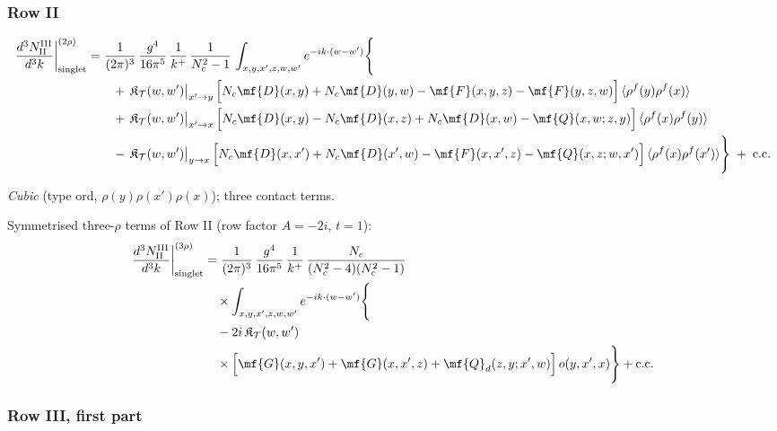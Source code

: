 {\subsubsection*{Row II}

\begin{align}
\frac{d^{3}N^{\rm III}_{\rm II}}{d^{3}k}\bigg|^{(2\rho)}_{\rm singlet}&=\frac{1}{(2\pi)^{3}}\,\frac{g^{4}}{16\pi^{5}}\,\frac{1}{k^{+}}\,\frac{1}{N_{c}^{2}-1}\,\int_{x,y,x',z,w,w'}e^{-ik\cdot(w-w')}\Bigg\{\notag\\
&\qquad +\,\mathfrak{K}_{\mathcal{T}}(w,w')\big|_{x'\to y}\,\Big[N_{c}\mf{D}(x,y)+N_{c}\mf{D}(y,w)-\mf{F}(x,y,z)-\mf{F}(y,z,w)\Big]\,\langle\rho^{f}(y)\rho^{f}(x)\rangle\notag\\
&\qquad +\,\mathfrak{K}_{\mathcal{T}}(w,w')\big|_{x'\to x}\,\Big[N_{c}\mf{D}(x,y)-N_{c}\mf{D}(x,z)+N_{c}\mf{D}(x,w)-\mf{Q}(x,w;z,y)\Big]\,\langle\rho^{f}(x)\rho^{f}(y)\rangle\notag\\
&\qquad -\,\mathfrak{K}_{\mathcal{T}}(w,w')\big|_{y\to x}\,\Big[N_{c}\mf{D}(x,x')+N_{c}\mf{D}(x',w)-\mf{F}(x,x',z)-\mf{Q}(x,z;w,x')\Big]\,\langle\rho^{f}(x)\rho^{f}(x')\rangle\Bigg\}\;+\;{\rm c.c.}\label{eq:s-III-II}
\end{align}

\emph{Cubic} (type ord, $\rho(y)\rho(x')\rho(x)$); three contact terms.

 Symmetrised three-$\rho$ terms of Row II (row factor $A=-2i$, $t=1$):
\begin{align}
\frac{d^{3}N^{\rm III}_{\rm II}}{d^{3}k}\bigg|^{(3\rho)}_{\rm singlet}&=\frac{1}{(2\pi)^{3}}\,\frac{g^{4}}{16\pi^{5}}\,\frac{1}{k^{+}}\,\frac{N_{c}}{(N_{c}^{2}-4)(N_{c}^{2}-1)}\notag\\
&\quad\times\int_{x,y,x',z,w,w'}e^{-ik\cdot(w-w')}\Bigg\{\notag\\
&\quad-2i\,\mathfrak{K}_{\mathcal{T}}(w,w')\notag\\
&\quad\times\Big[\mf{G}(x,y,x')+\mf{G}(x,x',z)+\mf{Q}_{d}(z,y;x',w)\Big]\,o(y,x',x)\Bigg\}+{\rm c.c.}\label{eq:s-o-III-II}
\end{align}
\subsubsection*{Row III, first part}

}
